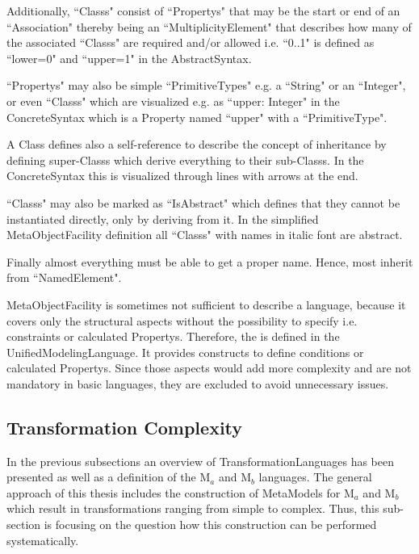 Additionally, ``\Glspl{Class}" consist of ``\Glspl{Property}" that may be the start or end of an ``\Gls{Association}" thereby being an ``MultiplicityElement" that describes how many of the associated ``\Glspl{Class}" are required and/or allowed i.e. ``0..1" is defined as ``lower=0" and ``upper=1" in the \gls{AbstractSyntax}. 

``\Glspl{Property}" may also be simple ``PrimitiveTypes" e.g. a ``String" or an ``Integer", or even ``\Glspl{Class}" which are visualized e.g. as ``upper: Integer" in the \gls{ConcreteSyntax} which is a \gls{Property} named ``upper" with a ``PrimitiveType". 

A \gls{Class} defines also a self-reference to describe the concept of inheritance by defining super-\glspl{Class} which derive everything to their sub-\glspl{Class}. In the \gls{ConcreteSyntax} this is visualized through lines with arrows at the end. 

``\Glspl{Class}" may also be marked as ``IsAbstract" which defines that they cannot be instantiated directly, only by deriving from it. In the simplified \gls{MetaObjectFacility} definition all ``\Glspl{Class}" with names in italic font are abstract. 

Finally almost everything must be able to get a proper name. Hence, most inherit from ``NamedElement".

\gls{MetaObjectFacility} is sometimes not sufficient to describe a language, because it covers only the structural aspects without the possibility to specify i.e. constraints or calculated \glspl{Property}. Therefore, the  \cite{ObjectManagementGroup2012} is defined in the \gls{UnifiedModelingLanguage}. It provides constructs to define conditions or calculated \glspl{Property}. Since those aspects would add more complexity and are not mandatory in basic languages, they are excluded to avoid unnecessary issues.

\subsection{Transformation Complexity}\label{secTransformationComplexity}

In the previous subsections an overview of \glspl{TransformationLanguage} has been presented as well as a definition of the M$_a$ and M$_b$ languages. The general approach of this thesis includes the construction of \glspl{MetaModel} for M$_a$ and M$_b$ which result in transformations ranging from simple to complex. Thus, this sub-section is focusing on the question how this construction can be performed systematically.

